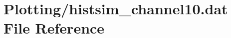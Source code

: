 \hypertarget{Plotting_2histsim__channel10_8dat}{}\section{Plotting/histsim\+\_\+channel10.dat File Reference}
\label{Plotting_2histsim__channel10_8dat}
